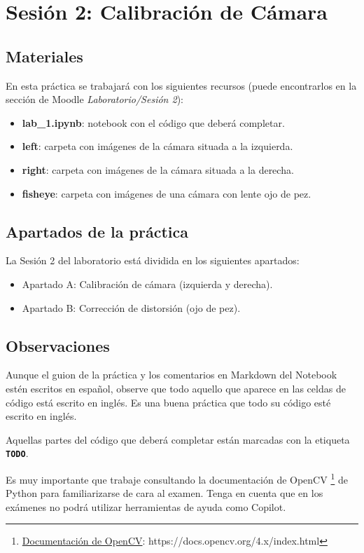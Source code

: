 \chapter{Sesión 2: Calibración de Cámara}
\label{chapter:introduction_ses_2}

\section{Materiales}
En esta práctica se trabajará con los siguientes recursos (puede encontrarlos en la sección de Moodle \textit{Laboratorio/Sesión 2}):

\begin{itemize}
    \item \textbf{lab\_1.ipynb}: notebook con el código que deberá completar.
    \item \textbf{left}: carpeta con imágenes de la cámara situada a la izquierda.
    \item \textbf{right}: carpeta con imágenes de la cámara situada a la derecha.
    \item \textbf{fisheye}: carpeta con imágenes de una cámara con lente ojo de pez.
\end{itemize}

\section{Apartados de la práctica}
La Sesión 2 del laboratorio está dividida en los siguientes apartados:

\begin{itemize}
    \item Apartado A: Calibración de cámara (izquierda y derecha).
    \item Apartado B:  Corrección de distorsión (ojo de pez).
\end{itemize}

\section{Observaciones}
Aunque el guion de la práctica y los comentarios en Markdown del Notebook estén escritos en español, observe que todo aquello que aparece en las celdas de código está escrito en inglés. Es una buena práctica que todo su código esté escrito en inglés.

Aquellas partes del código que deberá completar están marcadas con la etiqueta \textbf{\texttt{TODO}}.

Es muy importante que trabaje consultando la documentación de OpenCV \footnote{\href{https://docs.opencv.org/4.x/index.html}{Documentación de OpenCV}: https://docs.opencv.org/4.x/index.html} de Python para familiarizarse de cara al examen. Tenga en cuenta que en los exámenes no podrá utilizar herramientas de ayuda como Copilot.

